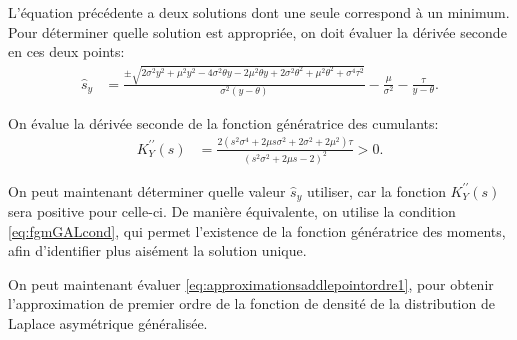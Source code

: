 L'équation précédente a deux solutions dont une seule correspond à un
minimum. Pour déterminer quelle solution est appropriée, on doit
évaluer la dérivée seconde en ces deux points:
\begin{align}
  \label{eq:saddlepointGAL}
  \hat{s}_y &=
  \frac{\pm\sqrt{2{\sigma}^{2}{{y}}^{2}+{\mu}^{2}{{y}}^{2}-4{\sigma}^{2}\theta{y}-2{\mu}^{2}\theta{y}+2{\sigma}^{2}{\theta}^{2}+{\mu}^{2}{\theta}^{2}+{\sigma}^{4}{\tau}^{2}}}{{\sigma}^{2}(y-\theta)}
  -\frac{\mu}{\sigma^{2}} -\frac{\tau}{y-\theta}.
\end{align}

On évalue la dérivée seconde de la fonction génératrice des cumulants:
\begin{align}
  \label{eq:derivcumulantGAL2}
  K^{\prime\prime}_Y({s}) &= \frac{2\left(
      {s}^{2}{\sigma}^{4}+2\mu{s}{\sigma}^{2}+2{\sigma}^{2}+2{\mu}^{2}\right)
    \tau}{{\left( {s}^{2}{\sigma}^{2}+2\mu{s}-2\right) }^{2}} > 0.
\end{align}

On peut maintenant déterminer quelle valeur $\hat{s}_y$ utiliser, car
la fonction $K^{\prime\prime}_Y({s})$ sera positive pour celle-ci. De manière équivalente, on utilise la condition
\ref{eq:fgmGALcond}, qui permet l'existence de la fonction génératrice
des moments, afin d'identifier plus aisément la solution unique.

On peut maintenant évaluer \eqref{eq:approximationsaddlepointordre1},
pour obtenir l'approximation de premier ordre de la fonction de
densité de la distribution de Laplace asymétrique généralisée.



